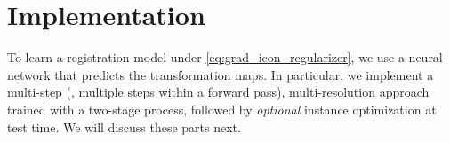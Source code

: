 
\vspace{-0.15cm}
\section{Implementation}
\label{sec:network_architecture}
\vspace{-0.15cm}
To learn a registration model under \ref{eq:grad_icon_regularizer}, we use a neural network that predicts the transformation maps. In particular, we implement a multi-step (\ie, multiple steps within a forward pass), multi-resolution approach trained with a two-stage process, followed by \emph{optional} instance optimization at test time. We will discuss these parts next.

\vspace{-0.15cm}
